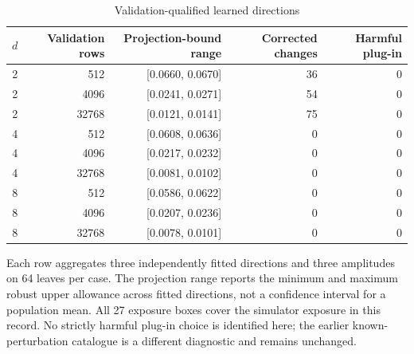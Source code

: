 \begin{table}[htbp]
\centering
\caption{Validation-qualified learned directions}\label{tab:learned-null56}
{\small\setlength{\tabcolsep}{4pt}
\begin{tabular}{rrrrr}
\toprule
$d$ & Validation rows & Projection-bound range & Corrected changes & Harmful plug-in \\
\midrule
2 & 512 & [0.0660, 0.0670] & 36 & 0 \\
2 & 4096 & [0.0241, 0.0271] & 54 & 0 \\
2 & 32768 & [0.0121, 0.0141] & 75 & 0 \\
4 & 512 & [0.0608, 0.0636] & 0 & 0 \\
4 & 4096 & [0.0217, 0.0232] & 0 & 0 \\
4 & 32768 & [0.0081, 0.0102] & 0 & 0 \\
8 & 512 & [0.0586, 0.0622] & 0 & 0 \\
8 & 4096 & [0.0207, 0.0236] & 0 & 0 \\
8 & 32768 & [0.0078, 0.0101] & 0 & 0 \\
\bottomrule
\end{tabular}}
\par\smallskip
{\footnotesize Each row aggregates three independently fitted directions and three amplitudes on 64 leaves per case. The projection range reports the minimum and maximum robust upper allowance across fitted directions, not a confidence interval for a population mean. All 27 exposure boxes cover the simulator exposure in this record. No strictly harmful plug-in choice is identified here; the earlier known-perturbation catalogue is a different diagnostic and remains unchanged.}
\end{table}

